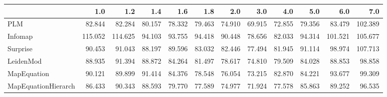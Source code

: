 \begin{tabular}{lrrrrrrrrrrr}
\toprule
{} &     1.0 &     1.2 &    1.4 &    1.6 &    1.8 &    2.0 &    3.0 &    4.0 &    5.0 &     6.0 &     7.0 \\
\midrule
PLM                 &  82.844 &  82.284 & 80.157 & 78.332 & 79.463 & 74.910 & 69.915 & 72.855 & 79.356 &  83.479 & 102.389 \\
Infomap             & 115.052 & 114.625 & 94.103 & 93.755 & 94.418 & 90.448 & 78.656 & 82.033 & 94.314 & 101.521 & 105.677 \\
Surprise            &  90.453 &  91.043 & 88.197 & 89.596 & 83.032 & 82.446 & 77.494 & 81.945 & 91.114 &  98.974 & 107.713 \\
LeidenMod           &  88.935 &  91.394 & 88.872 & 84.264 & 81.497 & 78.617 & 74.810 & 79.509 & 84.028 &  88.853 &  98.858 \\
MapEquation         &  90.121 &  89.899 & 91.414 & 84.376 & 78.548 & 76.054 & 73.215 & 82.870 & 84.221 &  93.677 &  99.309 \\
MapEquationHierarch &  86.433 &  90.343 & 88.593 & 79.770 & 77.589 & 74.977 & 71.924 & 77.578 & 85.863 &  89.252 &  96.535 \\
\bottomrule
\end{tabular}
